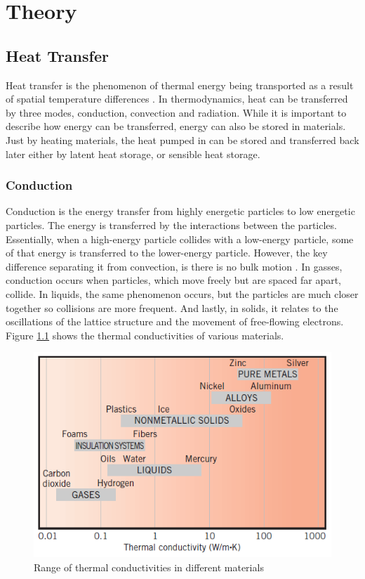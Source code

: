 \chapter{Theory}
\label{chap:theory}

\section{Heat Transfer}
\label{chap:heat_transfer}
Heat transfer is the phenomenon of thermal energy being transported as a result of spatial temperature differences \cite{Bergman_2011}. In thermodynamics, heat can be transferred by three modes, conduction, convection and radiation. While it is important to describe how energy can be transferred, energy can also be stored in materials. Just by heating materials, the heat pumped in can be stored and transferred back later either by latent heat storage, or sensible heat storage. 

\subsection*{Conduction}
Conduction is the energy transfer from highly energetic particles to low energetic particles. The energy is transferred by the interactions between the particles. Essentially, when a high-energy particle collides with a low-energy particle, some of that energy is transferred to the lower-energy particle. However, the key difference separating it from convection, is there is no bulk motion \cite{Bergman_2011}. In gasses, conduction occurs when particles, which move freely but are spaced far apart, collide. In liquids, the same phenomenon occurs, but the particles are much closer together so collisions are more frequent. And lastly, in solids, it relates to the oscillations of the lattice structure and the movement of free-flowing electrons. Figure \ref{fig:conductivity_of_materials} shows the thermal conductivities of various materials.
\begin{figure}[ht]
	\centering
	\includegraphics[width=0.75\linewidth]{figures/chapter_2/Conductivity.png}
	\caption{Range of thermal conductivities in different materials \cite{Bergman_2011}}
	\label{fig:conductivity_of_materials}
\end{figure}

